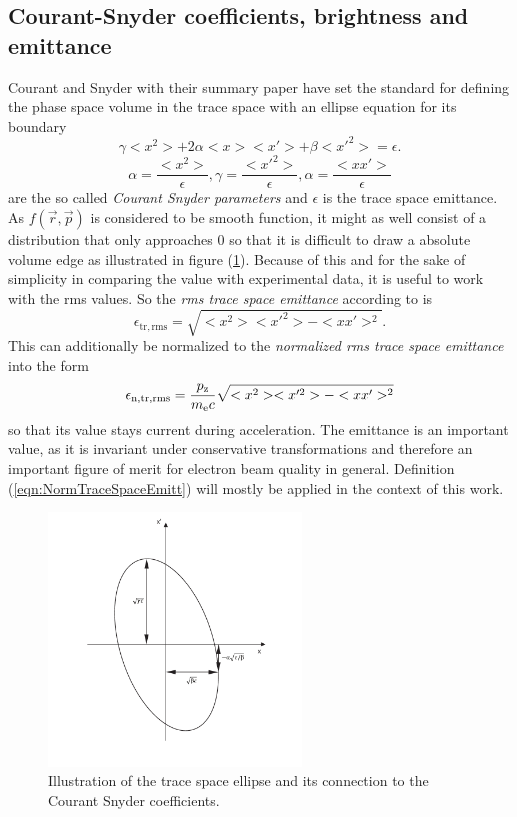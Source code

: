\subsection{Courant-Snyder coefficients, brightness and emittance}
Courant and Snyder with their summary paper \cite{COURANT1958} have set the standard for defining the phase space volume in the trace space with an ellipse equation for its boundary
\begin{equation}
\label{eqn:CourandSnyderEllipse}
\gamma <x^2>+2\alpha <x> <x'>+\beta <x'^2> =\epsilon.
\end{equation}
\begin{equation}
\alpha =\frac{<x^2>}{\epsilon}, \gamma=\frac{<x'^2>}{\epsilon}, \alpha=\frac{<xx'>}{\epsilon}
\end{equation}
are the so called \textit{Courant Snyder parameters} and $\epsilon$ is the trace space emittance. 
As $f(\vec{r},\vec{p})$ is considered to be smooth function, it might as well consist of a distribution that only approaches 0 so that it is difficult to draw a absolute volume edge as illustrated in figure (\ref{img:TraceSpace}).
Because of this and for the sake of simplicity in comparing the value with experimental data, it is useful to work with the rms values. So the \textit{rms trace space emittance} according to \cite{PRSTAB_Emittance_Floettmann} is
\begin{equation}
\epsilon_\mathrm{tr,rms}=\sqrt{<x^2><x'^2>-<xx'>^2}.
\end{equation}
This can additionally be normalized to the \textit{normalized rms trace space emittance} into the form
\begin{equation}
\label{eqn:NormTraceSpaceEmitt}
\epsilon_\mathrm{n,tr,rms}=\frac{p_\mathrm{z}}{m_\mathrm{e} c}\sqrt{<x^2><x'^2>-<xx'>^2}
\end{equation} 
so that its value stays current during acceleration.
The emittance is an important value, as it is invariant under conservative transformations and therefore an important 
figure of merit for electron beam quality in general. 
Definition (\ref{eqn:NormTraceSpaceEmitt}) will mostly be applied in the context of this work.
\begin{figure}[htbp]
\begin{center}
\includegraphics[width=0.6\textwidth]{theory/images/edited/TraceSpaceCourantSnyder.pdf}
\end{center}
\caption{Illustration of the trace space ellipse and its connection to the Courant Snyder coefficients.}
\label{img:TraceSpace}
\end{figure}
